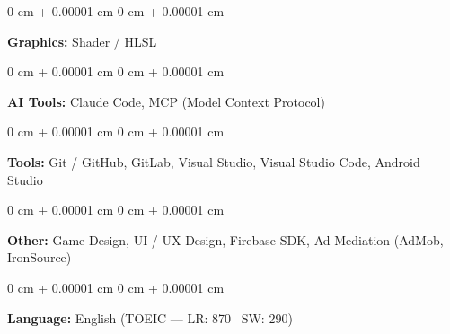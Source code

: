 \documentclass[10pt, letterpaper]{article}
\newenvironment{onecolentry}{
    \begin{adjustwidth}{
        0 cm + 0.00001 cm
    }{
        0 cm + 0.00001 cm
    }
}{
    \end{adjustwidth}
} %
\begin{document}
        \vspace{0.2 cm}

        \begin{onecolentry}
            \textbf{Graphics:} Shader / HLSL
        \end{onecolentry}

        \vspace{0.2 cm}

        \begin{onecolentry}
            \textbf{AI Tools:} Claude Code, MCP (Model Context Protocol)
        \end{onecolentry}

        \vspace{0.2 cm}

        \begin{onecolentry}
            \textbf{Tools:} Git / GitHub, GitLab, Visual Studio, Visual Studio Code, Android Studio
        \end{onecolentry}

        \vspace{0.2 cm}

        \begin{onecolentry}
            \textbf{Other:} Game Design, UI / UX Design, Firebase SDK, Ad Mediation (AdMob, IronSource)
        \end{onecolentry}

        \vspace{0.2 cm}

        \begin{onecolentry}
            \textbf{Language:} English (TOEIC — LR: 870 \textbar\ SW: 290)
        \end{onecolentry}
\end{document}
